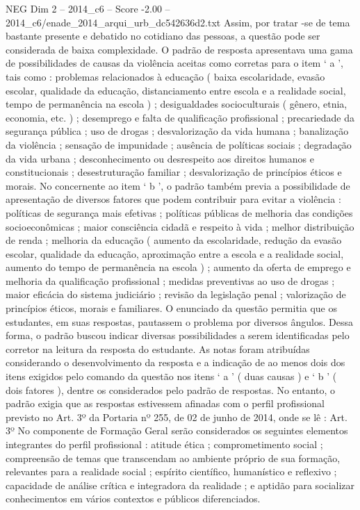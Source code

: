 \begin{textsample}{NEG Dim 2 – 2014\_c6 – Score -2.00 – 2014\_c6/enade\_2014\_arqui\_urb\_dc542636d2.txt}
Assim, por tratar -se de tema bastante presente e debatido no cotidiano das pessoas, a questão pode ser considerada de baixa complexidade.
O padrão de resposta apresentava uma gama de possibilidades de causas da violência aceitas como corretas para o item ‘ a ’, tais como : problemas relacionados à educação ( baixa escolaridade, evasão escolar, qualidade da educação, distanciamento entre escola e a realidade social, tempo de permanência na escola ) ; desigualdades socioculturais ( gênero, etnia, economia, etc. ) ; desemprego e falta de qualificação profissional ; precariedade da segurança pública ; uso de drogas ; desvalorização da vida humana ; banalização da violência ; sensação de impunidade ; ausência de políticas sociais ; degradação da vida urbana ; desconhecimento ou desrespeito aos direitos humanos e constitucionais ; desestruturação familiar ; desvalorização de princípios éticos e morais.
No concernente ao item ‘ b ’, o padrão também previa a possibilidade de apresentação de diversos fatores que podem contribuir para evitar a violência : políticas de segurança mais efetivas ; políticas públicas de melhoria das condições socioeconômicas ; maior consciência cidadã e respeito à vida ; melhor distribuição de renda ; melhoria da educação ( aumento da escolaridade, redução da evasão escolar, qualidade da educação, aproximação entre a escola e a realidade social, aumento do tempo de permanência na escola ) ; aumento da oferta de emprego e melhoria da qualificação profissional ; medidas preventivas ao uso de drogas ; maior eficácia do sistema judiciário ; revisão da legislação penal ; valorização de princípios éticos, morais e familiares.
O enunciado da questão permitia que os estudantes, em suas respostas, pautassem o problema por diversos ângulos.
Dessa forma, o padrão buscou indicar diversas possibilidades a serem identificadas pelo corretor na leitura da resposta do estudante.
As notas foram atribuídas considerando o desenvolvimento da resposta e a indicação de ao menos dois dos itens exigidos pelo comando da questão nos itens ‘ a ’ ( duas causas ) e ‘ b ’ ( dois fatores ), dentre os considerados pelo padrão de respostas.
No entanto, o padrão exigia que as respostas estivessem afinadas com o perfil profissional previsto no Art. 3º da Portaria nº 255, de 02 de junho de 2014, onde se lê : Art. 3º No componente de Formação Geral serão considerados os seguintes elementos integrantes do perfil profissional : atitude ética ; comprometimento social ; compreensão de temas que transcendam ao ambiente próprio de sua formação, relevantes para a realidade social ; espírito científico, humanístico e reflexivo ; capacidade de análise crítica e integradora da realidade ; e aptidão para socializar conhecimentos em vários contextos e públicos diferenciados.

\end{textsample}
